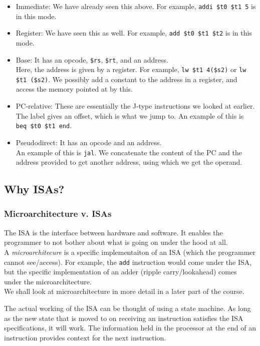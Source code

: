 \documentclass{article}
\begin{document}
		\begin{itemize}
			\item Immediate: We have already seen this above. For example, \texttt{addi \$t0 \$t1 5} is in this mode.
			\item Register: We have seen this as well. For example, \texttt{add \$t0 \$t1 \$t2} is in this mode.
			\item Base: It has an opcode, \texttt{\$rs}, \texttt{\$rt}, and an address.\\
			Here, the address is given by a register. For example, \texttt{lw \$t1 4(\$s2)} or \texttt{lw \$t1 (\$s2)}. We possibly add a constant to the address in a register, and access the memory pointed at by this.
			\item PC-relative: These are essentially the J-type instructions we looked at earlier. The label gives an offset, which is what we jump to. An example of this is \texttt{beq \$t0 \$t1 end}.
			\item Pseudodirect: It has an opcode and an address.\\
			An example of this is \texttt{jal}. We concatenate the content of the PC and the address provided to get another address, using which we get the operand.
		\end{itemize}

	\subsection{Why ISAs?}

		\subsubsection{Microarchitecture v. ISAs}

			The ISA is the interface between hardware and software. It enables the programmer to not bother about what is going on under the hood at all.\\
			A \emph{microarchitecure} is a specific implementaiton of an ISA (which the programmer cannot see/access). For example, the \texttt{add} instruction would come under the ISA, but the specific implementation of an adder (ripple carry/lookahead) comes under the microarchitecture.\\
			We shall look at microarchitecture in more detail in a later part of the course.

			The actual working of the ISA can be thought of using a state machine. As long as the new state that is moved to on receiving an instruction satisfies the ISA specifications, it will work. The information held in the processor at the end of an instruction provides context for the next instruction.
\end{document}
